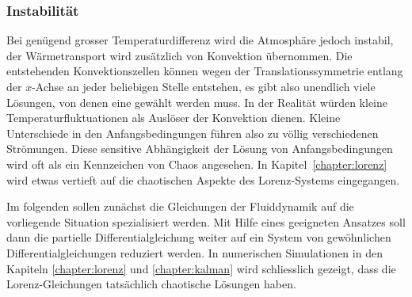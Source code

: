 \subsubsection{Instabilität}
Bei genügend grosser Temperaturdifferenz wird die Atmosphäre jedoch
instabil, der Wärmetransport wird zusätzlich von Konvektion übernommen.
Die entstehenden Konvektionszellen können wegen der Translationssymmetrie
entlang der $x$-Achse an jeder beliebigen Stelle entstehen, es gibt also
unendlich viele Lösungen, von denen eine gewählt werden muss.
In der Realität würden kleine Temperaturfluktuationen als Auslöser der 
Konvektion dienen.
Kleine Unterschiede in den Anfangsbedingungen führen also zu völlig
verschiedenen Strömungen.
Diese sensitive Abhängigkeit der Lösung von Anfangsbedingungen wird
oft als ein Kennzeichen von Chaos angesehen.
In Kapitel~\ref{chapter:lorenz} wird etwas vertieft auf die chaotischen
Aspekte des Lorenz-Systems eingegangen.

Im folgenden sollen zunächst die Gleichungen der Fluiddynamik auf die
vorliegende Situation spezialisiert werden.
Mit Hilfe eines geeigneten Ansatzes soll dann die partielle
Differentialgleichung weiter auf ein System von gewöhnlichen 
Differentialgleichungen reduziert werden.
In numerischen Simulationen in den Kapiteln
\ref{chapter:lorenz} und \ref{chapter:kalman}
wird schliesslich gezeigt, dass die 
Lorenz-Gleichungen tatsächlich chaotische Lösungen haben.


